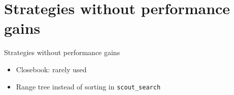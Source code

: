 \documentclass[10pt]{beamer}
\newcommand{\itema}{\item[*]}
\begin{document}
	\section{Strategies without performance gains}
	\begin{frame}{Strategies without performance gains}
	    \begin{itemize}
	        \itema Closebook: rarely used
	        \itema Range tree instead of sorting in  {\tt scout\_search}
	    \end{itemize}
	\end{frame}
\end{document}
